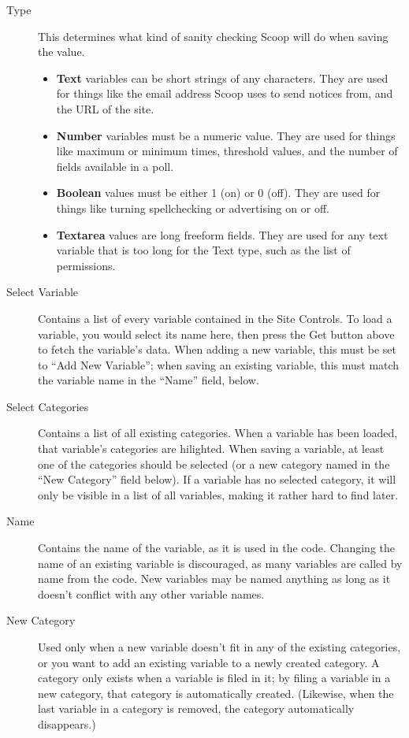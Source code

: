 \begin{description}
\item[Type] This determines what kind of sanity checking Scoop will do when saving the value.  
\begin{itemize}
\item {\bf Text} variables can be short strings of any characters.  They are used for things like the email address Scoop uses to send notices from, and the URL of the site.  
\item {\bf Number} variables must be a numeric value.  They are used for things like maximum or minimum times, threshold values, and the number of fields available in a poll.  
\item {\bf Boolean} values must be either 1 (on) or 0 (off).  They are used for things like turning spellchecking or advertising on or off.
\item {\bf Textarea} values are long freeform fields.  They are used for any text variable that is too long for the Text type, such as the list of permissions.
\end{itemize}
\item[Select Variable] Contains a list of every variable contained in the Site Controls.  To load a variable, you would select its name here, then press the Get button above to fetch the variable's data.  When adding a new variable, this must be set to ``Add New Variable''; when saving an existing variable, this must match the variable name in the ``Name'' field, below.
\item[Select Categories] Contains a list of all existing categories.  When a variable has been loaded, that variable's categories are hilighted.  When saving a variable, at least one of the categories should be selected (or a new category named in the ``New Category'' field below).  If a variable has no selected category, it will only be visible in a list of all variables, making it rather hard to find later.
\item[Name] Contains the name of the variable, as it is used in the code.  Changing the name of an existing variable is discouraged, as many variables are called by name from the code.  New variables may be named anything as long as it doesn't conflict with any other variable names.
\item[New Category] Used only when a new variable doesn't fit in any of the existing categories, or you want to add an existing variable to a newly created category.  A category only exists when a variable is filed in it; by filing a variable in a new category, that category is automatically created.  (Likewise, when the last variable in a category is removed, the category automatically disappears.)

\end{description}
